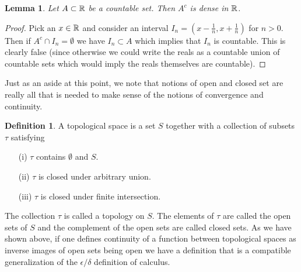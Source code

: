 \documentclass{amsart}
\newtheorem{lem}[thm]{Lemma}
\theoremstyle{remark}
\theoremstyle{definition}
\newtheorem{defn}[thm]{Definition}
\begin{document}
\begin{lem}\label{ComplementOfCountableSetDense}Let $A \subset \mathbb{R}$ be a countable set.  Then $A^c$ is
  dense in $\mathbb{R}$.
\end{lem}
\begin{proof}
Pick an $x \in \mathbb{R}$ and consider an interval $I_n = (x - \frac{1}{n}, x +
\frac{1}{n})$ for $n > 0$.  Then if $A^c \cap I_n = \emptyset$ we have
$I_n \subset A$ which implies that $I_n$ is countable.  This is
clearly false (since otherwise we could write the reals as a countable
union of countable sets which would imply the reals themselves are countable).
\end{proof}

Just as an aside at this point, we note that notions of open and
closed set are really all that is needed to make sense of the notions
of convergence and continuity.
\begin{defn}A topological space is a set $S$ together with a
  collection of subsets $\tau$ satisfying
\begin{itemize}
\item[(i)]$\tau$ contains $\emptyset$ and $S$.
\item[(ii)]$\tau$ is closed under arbitrary union.
\item[(iii)]$\tau$ is closed under finite intersection.
\end{itemize}
The collection $\tau$ is called a topology on $S$.  The elements of
$\tau$ are called the open sets of $S$ and the complement of the open
sets are called closed sets.  As we have shown above, if one defines
continuity of a function between topological spaces as inverse images
of open sets being open we have a definition that is a compatible
generalization of the $\epsilon/\delta$ definition of calculus.
\end{defn}
\end{document}
